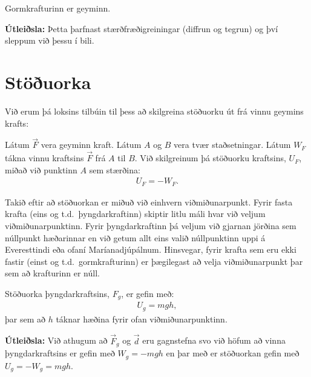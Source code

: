 \begin{tcolorbox}
\begin{theorem}
Gormkrafturinn er geyminn.
\end{theorem}
\end{tcolorbox}

\textbf{Útleiðsla:} Þetta þarfnast stærðfræðigreiningar (diffrun og tegrun) og því sleppum við þessu í bili.


\section{Stöðuorka}

Við erum þá loksins tilbúin til þess að skilgreina stöðuorku út frá vinnu geymins krafts:

\begin{tcolorbox}
\begin{definition}
Látum $\Vec{F}$ vera geyminn kraft. Látum $A$ og $B$ vera tvær staðsetningar. Látum $W_F$ tákna vinnu kraftsins $\vec{F}$ frá $A$ til $B$. Við skilgreinum þá stöðuorku kraftsins, $U_F$, miðað við punktinn $A$ sem stærðina:
\begin{align*}
    U_F = -W_F.
\end{align*}
\end{definition}
\end{tcolorbox}
Takið eftir að stöðuorkan er miðuð við einhvern viðmiðunarpunkt. Fyrir fasta krafta (eins og t.d.~þyngdarkraftinn) skiptir litlu máli hvar við veljum viðmiðunarpunktinn. Fyrir þyngdarkraftinn þá veljum við gjarnan jörðina sem núllpunkt hæðarinnar en við getum allt eins valið núllpunktinn uppi á Everesttindi eða ofaní Maríanadjúpálnum. Hinsvegar, fyrir krafta sem eru ekki fastir (einst og t.d.~gormkrafturinn) er þægilegast að velja viðmiðunarpunkt þar sem að krafturinn er núll.

\begin{tcolorbox}
\begin{theorem}
Stöðuorka þyngdarkraftsins, $F_g$, er gefin með:
\begin{align*}
    U_g = mgh,
\end{align*}
þar sem að $h$ táknar hæðina fyrir ofan viðmiðunarpunktinn.
\end{theorem}
\end{tcolorbox}

\textbf{Útleiðsla:} Við athugum að $\vec{F}_g$ og $\vec{d}$ eru gagnstefna svo við höfum að vinna þyngdarkraftsins er gefin með $W_g = -mgh$ en þar með er stöðuorkan gefin með $U_g = -W_g = mgh$.


